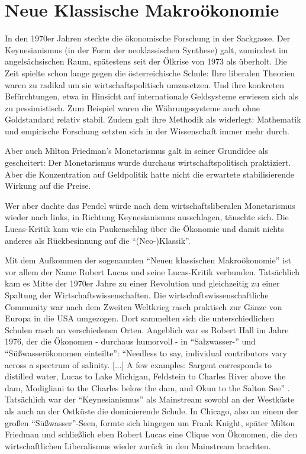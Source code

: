 %
%
%

\chapter{Neue Klassische Makroökonomie}
\label{Neue Makro}

In den 1970er Jahren steckte die ökonomische Forschung in der Sackgasse. Der Keynesianismus (in der Form der neoklassischen Synthese) galt, zumindest im angelsächsischen Raum, spätestens seit der Ölkrise von 1973 als überholt. Die Zeit spielte schon lange gegen die österreichische Schule: Ihre liberalen Theorien waren zu radikal um sie wirtschaftspolitisch umzusetzen. Und ihre konkreten Befürchtungen, etwa in Hinsicht auf internationale Geldsysteme erwiesen sich als zu pessimistisch. Zum Beispiel waren die Währungssysteme auch ohne Goldstandard relativ stabil. Zudem galt ihre Methodik als widerlegt: Mathematik und empirische Forschung setzten sich in der Wissenschaft immer mehr durch. 

Aber auch Milton Friedman's Monetarismus galt in seiner Grundidee als gescheitert: Der Monetarismus wurde durchaus wirtschaftspolitisch praktiziert. Aber die Konzentration auf Geldpolitik hatte nicht die erwartete stabilisierende Wirkung auf die Preise.

Wer aber dachte das Pendel würde nach dem wirtschaftsliberalen Monetarismus wieder nach links, in Richtung Keynesianismus ausschlagen, täuschte sich. Die Lucas-Kritik kam wie ein Paukenschlag über die Ökonomie und damit nichts anderes als Rückbesinnung auf die "`(Neo-)Klassik"'.

Mit dem Aufkommen der sogenannten "`Neuen klassischen Makroökonomie"' ist vor allem der Name Robert Lucas und seine Lucas-Kritik \parencite{Lucas1976} verbunden. Tatsächlich kam es Mitte der 1970er Jahre zu einer Revolution und gleichzeitig zu einer Spaltung der Wirtschaftswissenschaften. Die wirtschaftswissenschaftliche Community war nach dem Zweiten Weltkrieg rasch praktisch zur Gänze von Europa in die USA umgezogen. Dort sammelten sich die unterschiedlichen Schulen rasch an verschiedenen Orten. Angeblich war es Robert Hall im Jahre 1976, der die Ökonomen - durchaus humorvoll - in "`Salzwasser-"' und "`Süßwasserökonomen einteilte"': "`Needless to say, individual contributors vary across a spectrum of salinity. [...] A few examples: Sargent corresponds to distilled water, Lucas to Lake Michigan, Feldstein to Charles River above the dam, Modigliani to the Charles below the dam, and Okun to the Salton See"' \parencite[S. 1]{Hall1976}. Tatsächlich war der "`Keynesianismus"' als Mainstream sowohl an der Westküste als auch an der Ostküste die dominierende Schule. In Chicago, also an einem der großen "`Süßwasser"'-Seen, formte sich hingegen um Frank Knight, später Milton Friedman und schließlich eben Robert Lucas eine Clique von Ökonomen, die den wirtschaftlichen Liberalismus wieder zurück in den Mainstream brachten.

